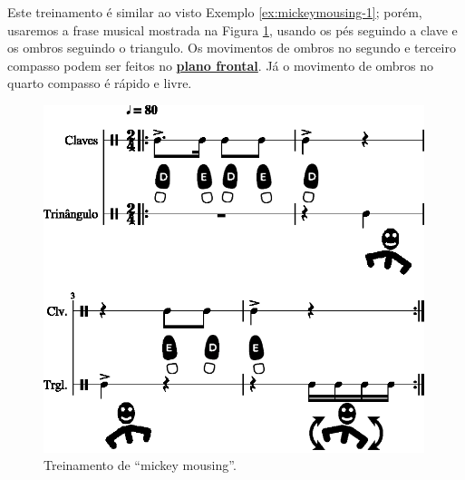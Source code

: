 \begin{example}
\label{ex:mickeymousing-2}
Este treinamento é similar ao visto Exemplo \ref{ex:mickeymousing-1};
porém, 
usaremos a frase musical mostrada na Figura \ref{fig:mickey-mousing-2-1}, 
usando os pés seguindo a clave e os ombros seguindo o triangulo.
Os movimentos de ombros no segundo e terceiro compasso
podem ser feitos no \hyperref[def:PlanoFrontal]{\textbf{plano frontal}}.
Já o movimento de ombros no quarto compasso é rápido e livre. 
\end{example}
\begin{figure}[h!]
    \centering
    \includegraphics[width=0.99\textwidth]{chapters/cap-musicalidade-tecnica/mickey-mousing-2-1.eps}
    \caption{Treinamento de ``mickey mousing''.}
    \label{fig:mickey-mousing-2-1}
\end{figure}


